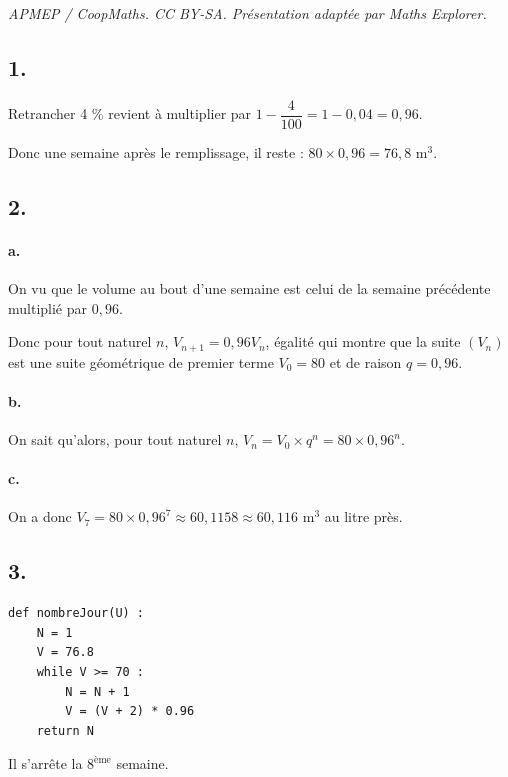 \documentclass[10pt]{article}
\begin{document}
\noindent\textit{APMEP / CoopMaths. CC BY-SA. Présentation adaptée par Maths Explorer.}\par\medskip
\subsection*{1.}

Retrancher 4 \% revient à multiplier par \(1 - \dfrac{4}{100} = 1 - 0{,}04 = 0{,}96\).

Donc une semaine après le remplissage, il reste : \(80 \times 0{,}96 = 76{,}8 \text{ m}^3\).

\subsection*{2.}

\paragraph{a.} On vu que le volume au bout d'une semaine est celui de la semaine précédente multiplié par \(0{,}96\).

Donc pour tout naturel \(n\), \(V_{n+1} = 0{,}96V_n\), égalité qui montre que la suite \((V_n)\) est une suite géométrique de premier terme \(V_0 = 80\) et de raison \(q = 0{,}96\).

\paragraph{b.} On sait qu'alors, pour tout naturel \(n\), \(V_n = V_0 \times q^n = 80 \times 0{,}96^n\).

\paragraph{c.} On a donc \(V_7 = 80 \times 0{,}96^7 \approx 60{,}1158 \approx 60{,}116\) m\(^3\) au litre près.

\subsection*{3.}

\begin{center}
\begin{lstlisting}[style=python]
def nombreJour(U) :
    N = 1
    V = 76.8
    while V >= 70 :
        N = N + 1
        V = (V + 2) * 0.96
    return N
\end{lstlisting}
\end{center}

Il s'arrête la \(8^{\text{ème}}\) semaine.
\end{document}
